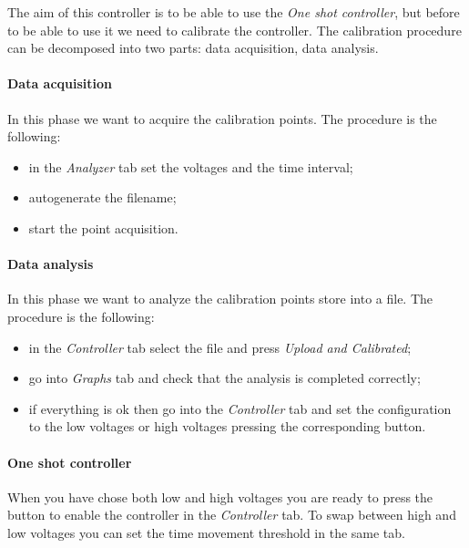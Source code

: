 

The aim of this controller is to be able to use the \emph{One shot
  controller}, but before to be able to use it we need to calibrate the
controller. The calibration procedure can be decomposed into two parts:
data acquisition, data analysis.

\paragraph{Data acquisition}

In this phase we want to acquire the calibration points. The procedure
is the following:

\begin{itemize}
  \itemsep1pt\parskip0pt
  \item
        in the \emph{Analyzer} tab set the voltages and the time interval;
  \item
        autogenerate the filename;
  \item
        start the point acquisition.
\end{itemize}

\paragraph{Data analysis}

In this phase we want to analyze the calibration points store into a
file. The procedure is the following:

\begin{itemize}
  \itemsep1pt\parskip0pt
  \item
        in the \emph{Controller} tab select the file and press \emph{Upload
          and Calibrated};
  \item
        go into \emph{Graphs} tab and check that the analysis is completed
        correctly;
  \item
        if everything is ok then go into the \emph{Controller} tab and set the
        configuration to the low voltages or high voltages pressing the
        corresponding button.
\end{itemize}

\paragraph{One shot controller}

When you have chose both low and high voltages you are ready to press
the button to enable the controller in the \emph{Controller} tab. To
swap between high and low voltages you can set the time movement
threshold in the same tab.


% 
